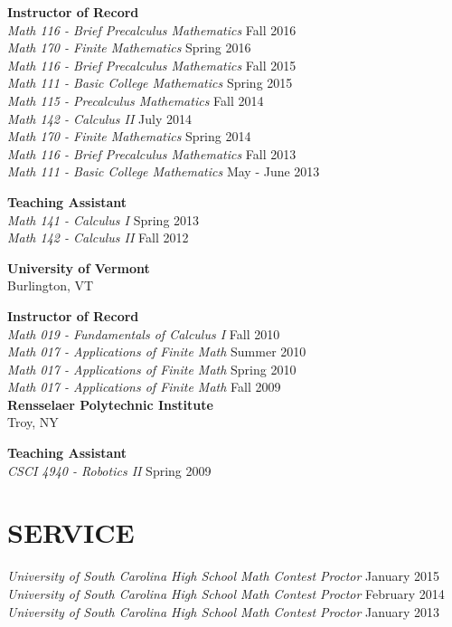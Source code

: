 \documentclass[line,overlapped]{res}
\begin{document}
\begin{resume}
         {\bf Instructor of Record}\\
         {\sl Math 116 - Brief Precalculus Mathematics} \hfill Fall 2016\\
         {\sl Math 170 - Finite Mathematics} \hfill Spring 2016\\
         {\sl Math 116 - Brief Precalculus Mathematics} \hfill Fall 2015\\
         {\sl Math 111 - Basic College Mathematics} \hfill Spring 2015\\
         {\sl Math 115 - Precalculus Mathematics} \hfill Fall 2014\\
         {\sl Math 142 - Calculus II} \hfill July 2014\\
         {\sl Math 170 - Finite Mathematics} \hfill Spring 2014\\
         {\sl Math 116 - Brief Precalculus Mathematics} \hfill Fall 2013\\
         {\sl Math 111 - Basic College Mathematics} \hfill May - June 2013

         {\bf Teaching Assistant}\\
         {\sl Math 141 - Calculus I} \hfill Spring 2013\\
         {\sl Math 142 - Calculus II} \hfill Fall 2012

         {\bf University of Vermont}\\Burlington, VT
         
         {\bf Instructor of Record}\\
         {\sl Math 019 - Fundamentals of Calculus I} \hfill Fall 2010\\
         {\sl Math 017 - Applications of Finite Math} \hfill Summer 2010\\
         {\sl Math 017 - Applications of Finite Math} \hfill Spring 2010\\
         {\sl Math 017 - Applications of Finite Math} \hfill Fall 2009\\
         
         {\bf Rensselaer Polytechnic Institute}\\Troy, NY

         {\bf Teaching Assistant}\\
         {\sl CSCI 4940 - Robotics II} \hfill Spring 2009\\

 \section{SERVICE}
         {\sl University of South Carolina High School Math Contest Proctor} \hfill January 2015\\
         {\sl University of South Carolina High School Math Contest Proctor} \hfill February 2014\\
         {\sl University of South Carolina High School Math Contest Proctor} \hfill January 2013


\end{resume}
\end{document}
